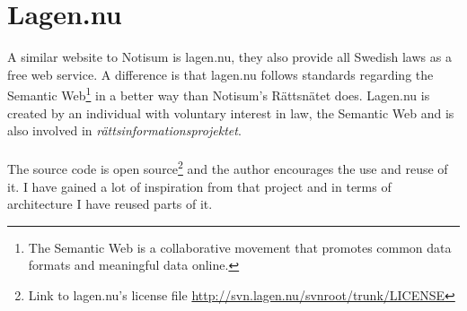 \section{Lagen.nu}
A similar website to Notisum is lagen.nu, they also provide all Swedish laws as a free web service. A difference is that lagen.nu follows standards regarding the Semantic Web\footnote{The Semantic Web is a collaborative movement that promotes common data formats and meaningful data online.} in a better way than Notisum's Rättsnätet does. Lagen.nu is created by an individual with voluntary interest in law, the Semantic Web and is also involved in \textit{rättsinformationsprojektet}.\\\\
The source code is open source\footnote{Link to lagen.nu’s license file \url{http://svn.lagen.nu/svnroot/trunk/LICENSE}} and the author encourages the use and reuse of it. I have gained a lot of inspiration from that project and in terms of architecture I have reused parts of it. 

